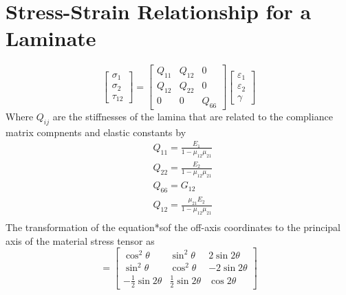 \documentclass[smallextended]{svjour3}       %
\begin{document}
\section{Stress-Strain Relationship for a Laminate}
\begin{equation}
    \begin{bmatrix}
        \sigma_1\\
        \sigma_2\\
        \tau_{12}
    \end{bmatrix}
    =
    \begin{bmatrix}
        Q_{11} & Q_{12} & 0\\
        Q_{12} & Q_{22} & 0\\
        0 & 0 & Q_{66}
    \end{bmatrix}
    \begin{bmatrix}
        \varepsilon_1\\
        \varepsilon_2\\
        \gamma
    \end{bmatrix}
\end{equation}
Where $Q_{ij}$ are the stiffnesses of the lamina that are related to the compliance matrix
compnents and elastic constants by
\begin{equation}
    \begin{split}
    &Q_{11}=\frac{E_1}{1-\mu_{12}\mu_{21}}\\
    &Q_{22}=\frac{E_2}{1-\mu_{12}\mu_{21}}\\
    &Q_{66}=G_{12}\\
    &Q_{12}=\frac{\mu_{21}E_2}{1-\mu_{12}\mu_{21}}\\
    \end{split}
\end{equation}
The transformation of the equation*sof the off-axis coordinates to the principal axis of the material stress tensor as
\begin{equation}
    [T]=
    \begin{bmatrix}
        \cos^2\theta & \sin^2\theta & 2\sin2\theta \\
        \sin^2\theta & \cos^2\theta & -2\sin2\theta \\
        -\frac{1}{2}\sin2\theta & \frac{1}{2}\sin2\theta & \cos2\theta
    \end{bmatrix}
\end{equation}
\end{document}
